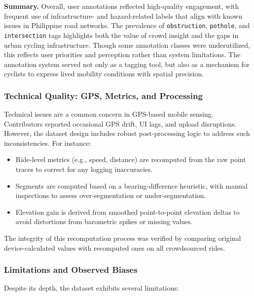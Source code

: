 \vspace{0.3cm}
\noindent\textbf{Summary.}
Overall, user annotations reflected high-quality engagement, with frequent use of infrastructure- and hazard-related labels that align with known issues in Philippine road networks. The prevalence of \texttt{obstruction}, \texttt{pothole}, and \texttt{intersection} tags highlights both the value of crowd insight and the gaps in urban cycling infrastructure. Though some annotation classes were underutilized, this reflects user priorities and perception rather than system limitations. The annotation system served not only as a tagging tool, but also as a mechanism for cyclists to express lived mobility conditions with spatial precision.

\subsubsection{Technical Quality: GPS, Metrics, and Processing}

Technical issues are a common concern in GPS-based mobile sensing. Contributors reported occasional GPS drift, UI lags, and upload disruptions. However, the dataset design includes robust post-processing logic to address such inconsistencies. For instance:

\begin{itemize}
\item Ride-level metrics (e.g., speed, distance) are recomputed from the raw point traces to correct for any logging inaccuracies.
\item Segments are computed based on a bearing-difference heuristic, with manual inspections to assess over-segmentation or under-segmentation.
\item Elevation gain is derived from smoothed point-to-point elevation deltas to avoid distortions from barometric spikes or missing values.
\end{itemize}

The integrity of this recomputation process was verified by comparing original device-calculated values with recomputed ones on all crowdsourced rides.

\subsubsection{Limitations and Observed Biases}

Despite its depth, the dataset exhibits several limitations:

